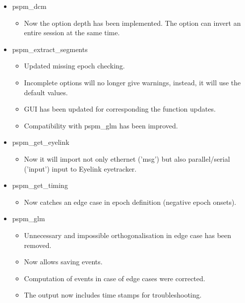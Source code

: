 \documentclass[english]{article}
\numberwithin{equation}{section}
\numberwithin{figure}{section}
\begin{document}
\begin{itemize}
\item pspm\_dcm

\begin{itemize}
\item Now the option depth has been implemented. The option can invert an entire session at the same time.
\end{itemize}

\item pspm\_extract\_segments

\begin{itemize}
\item Updated missing epoch checking.

\item Incomplete options will no longer give warnings, instead, it will use the default values.

\item GUI has been updated for corresponding the function updates.

\item Compatibility with pspm\_glm has been improved.
\end{itemize}

\item pspm\_get\_eyelink

\begin{itemize}
\item Now it will import not only ethernet ('msg') but also parallel/serial ('input') input to Eyelink eyetracker.
\end{itemize}

\item pspm\_get\_timing

\begin{itemize}
\item Now catches an edge case in epoch definition (negative epoch onsets).
\end{itemize}

\item pspm\_glm

\begin{itemize}
\item Unnecessary and impossible orthogonalisation in edge case has been removed.

\item Now allows saving events.

\item Computation of events in case of edge cases were corrected.

\item The output now includes time stamps for troubleshooting.
\end{itemize}


\end{itemize}
\end{document}
